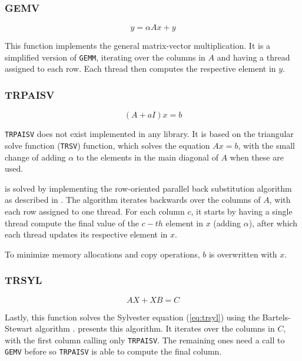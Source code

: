 \documentclass[../thesis]{subfiles}
\begin{document}
		\subsubsection{GEMV}

		\begin{equation}
			y = \alpha A x + y
			\label{eq:gemv}
		\end{equation}

		This function implements the general matrix-vector multiplication. It is a simplified version of \texttt{GEMM}, iterating over the columns in $A$ and having a thread assigned to each row. Each thread then computes the respective element in $y$.

		\subsubsection{TRPAISV}

		\begin{equation}
			(A + aI)x = b
			\label{eq:trpaisv}
		\end{equation}

		\texttt{TRPAISV} does not exist implemented in any \blas library. It is based on the triangular solve function (\texttt{TRSV}) function, which solves the equation $Ax = b$, with the small change of adding $\alpha$ to the elements in the main diagonal of $A$ when these are used.

		 is solved by implementing the row-oriented parallel back substitution algorithm as described in \cite[293-295]{Quinn:PP:2003}. The algorithm iterates backwards over the columns of $A$, with each row assigned to one thread. For each column $c$, it starts by having a single thread compute the final value of the $c-th$ element in $x$ (adding $\alpha$), after which each thread updates its respective element in $x$.

		To minimize memory allocations and copy operations, $b$ is overwritten with $x$.

		\subsubsection{TRSYL}
		\begin{equation}
			AX + XB = C
			\label{eq:trsyl}
		\end{equation}

		Lastly, this function solves the Sylvester equation (\cref{eq:trsyl}) using the Bartels-Stewart algorithm \cite[367-368]{Golub:Loan:MC:1996}.  presents this algorithm. It iterates over the columns in $C$, with the first column calling only \texttt{TRPAISV}. The remaining ones need a call to \texttt{GEMV} before so \texttt{TRPAISV} is able to compute the final column.
\end{document}
